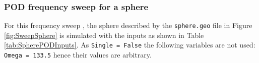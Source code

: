 \subsubsection{POD frequency sweep for a sphere}
For this frequency sweep , the sphere described by the \texttt{sphere.geo} file in Figure \ref{fig:SweepSphere} is simulated with the inputs as shown in Table \ref{tab:SpherePODInputs}. As  \texttt{Single = False} the following variables are not used:  \texttt{Omega = 133.5}  hence their values are arbitrary.
